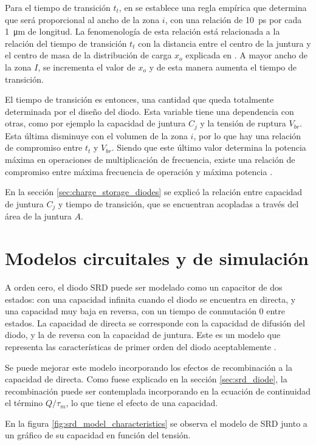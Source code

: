 Para el tiempo de transición $t_t$, en \cite{moll1969} se establece una regla
empírica que determina que será proporcional al ancho de la zona $i$, con una
relación de \qty{10}{\pico\second} por cada \qty{1}{\micro\meter} de longitud.
La fenomenología de esta relación está relacionada a la relación del tiempo de
transición $t_t$ con la distancia entre el centro de la juntura y el centro de
masa de la distribución de carga $x_o$ explicada en \cite{moll1962}. A mayor
ancho de la zona $I$, se incrementa el valor de $x_o$ y de esta manera aumenta
el tiempo de transición.

El tiempo de transición es entonces, una cantidad que queda totalmente
determinada por el diseño del diodo. Esta variable tiene una dependencia con
otras, como por ejemplo la capacidad de juntura $C_j$ y la tensión de ruptura
$V_{br}$. Esta última disminuye con el volumen de la zona $i$, por lo que hay
una relación de compromiso entre $t_t$ y $V_{br}$. Siendo que este último valor
determina la potencia máxima en operaciones de multiplicación de frecuencia,
existe una relación de compromiso entre máxima frecuencia de operación y máxima
potencia \cite{moll1969}.

En la sección \ref{sec:charge_storage_diodes} se explicó la relación entre
capacidad de juntura $C_j$ y tiempo de transición, que se encuentran acopladas a
través del área de la juntura $A$.

\section{Modelos circuitales y de simulación}
\label{sec:srd_simulation_models}

A orden cero, el diodo SRD puede ser modelado como un capacitor de dos estados: con
una capacidad infinita cuando el diodo se encuentra en directa, y una capacidad
muy baja en reversa, con un tiempo de conmutación 0 entre estados. La capacidad
de directa se corresponde con la capacidad de difusión del diodo, y la de
reversa con la capacidad de juntura. Este es un modelo que representa las
características de primer orden del diodo aceptablemente \cite{moll1969}.

Se puede mejorar este modelo incorporando los efectos de recombinación a la
capacidad de directa. Como fuese explicado en la sección \ref{sec:srd_diode}, la
recombinación puede ser contemplada incorporando en la ecuación de continuidad
el término $Q/\tau_m$, lo que tiene el efecto de una capacidad.

En la figura \ref{fig:srd_model_characteristics} se observa el modelo de SRD
junto a un gráfico de su capacidad en función del tensión.

